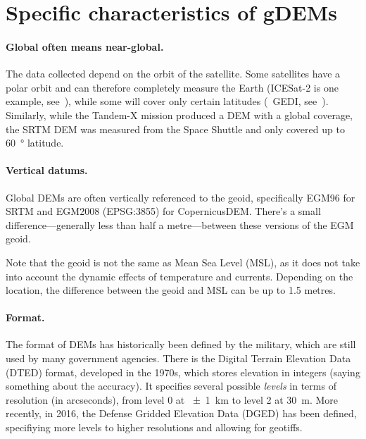 %
\section[Specific characteristics]{Specific characteristics of gDEMs}

\paragraph{Global often means near-global.}

The data collected depend on the orbit of the satellite.
Some satellites have a polar orbit and can therefore completely measure the Earth (ICESat-2 is one example, see~), while some will cover only certain latitudes (\eg\ GEDI, see~).
Similarly, while the Tandem-X mission produced a DEM with a global coverage, the SRTM DEM was measured from the Space Shuttle and only covered up to \qty{60}{\degree} latitude.


\paragraph{Vertical datums.}
Global DEMs are often vertically referenced to the geoid, specifically EGM96 for SRTM and EGM2008 (EPSG:3855) for CopernicusDEM.
There's a small difference---generally less than half a metre---between these versions of the EGM geoid.

Note that the geoid is not the same as Mean Sea Level (MSL), as it does not take into account the dynamic effects of temperature and currents.
Depending on the location, the difference between the geoid and MSL can be up to 1.5 metres.

\paragraph{Format.}  %
The format of DEMs has historically been defined by the military, which are still used by many government agencies.
There is the Digital Terrain Elevation Data (DTED) format, developed in the 1970s, which stores elevation in integers (saying something about the accuracy).
It specifies several possible \emph{levels} in terms of resolution (in arcseconds), from level 0 at \qty{\pm1}{km} to level 2 at \qty{30}{m}.
More recently, in 2016, the Defense Gridded Elevation Data (DGED) has been defined, specifiying more levels to higher resolutions and allowing for geotiffs.

